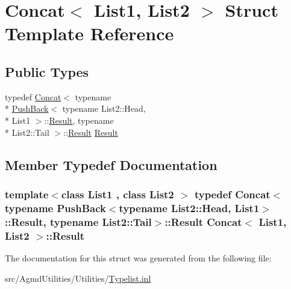 \hypertarget{struct_concat}{\section{Concat$<$ List1, List2 $>$ Struct Template Reference}
\label{struct_concat}
}
\subsection*{Public Types}
\begin{DoxyCompactItemize}
\item 
typedef \hyperlink{struct_concat}{Concat}$<$ typename \\*
\hyperlink{struct_push_back}{Push\+Back}$<$ typename List2\+::\+Head, \\*
List1 $>$\+::\hyperlink{struct_concat_a3f164f3b490e70c194dc7c5d6281d1d0}{Result}, typename \\*
List2\+::\+Tail $>$\+::\hyperlink{struct_concat_a3f164f3b490e70c194dc7c5d6281d1d0}{Result} \hyperlink{struct_concat_a3f164f3b490e70c194dc7c5d6281d1d0}{Result}
\end{DoxyCompactItemize}


\subsection{Member Typedef Documentation}
\hypertarget{struct_concat_a3f164f3b490e70c194dc7c5d6281d1d0}{
\subsubsection[{Result}]{\setlength{\rightskip}{0pt plus 5cm}template$<$class List1 , class List2 $>$ typedef {\bf Concat}$<$typename {\bf Push\+Back}$<$typename List2\+::\+Head, List1$>$\+::{\bf Result}, typename List2\+::\+Tail$>$\+::{\bf Result} {\bf Concat}$<$ List1, List2 $>$\+::{\bf Result}}}\label{struct_concat_a3f164f3b490e70c194dc7c5d6281d1d0}


The documentation for this struct was generated from the following file\+:\begin{DoxyCompactItemize}
\item 
src/\+Agmd\+Utilities/\+Utilities/\hyperlink{_typelist_8inl}{Typelist.\+inl}\end{DoxyCompactItemize}
